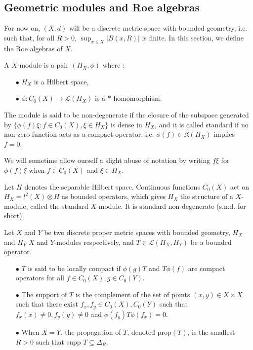 
\subsection{Geometric modules and Roe algebras}

For now on, $(X,d)$ will be a discrete metric space with bounded geometry, i.e. such that, for all $R>0$, $\sup_{x\in X} |B(x,R)|$ is finite. In this section, we define the Roe algebras of $X$. 

\begin{definition} A $X$-module is a pair $(H_X,\phi)$ where :
\begin{itemize}
\item[$\bullet$] $H_X$ is a Hilbert space,
\item[$\bullet$] $\phi : C_0(X)\rightarrow \mathcal L(H_X)$ is a $*$-homomorphism. 
\end{itemize}
The module is said to be non-degenerate if the closure of the subspace generated by $\{\phi(f)\xi : f\in C_0(X), \xi\in H_X\}$ is dense in $H_X$, and it is called standard if no non-zero function acts as a compact operator, i.e. $\phi(f) \in\mathfrak K(H_X)$ implies $f=0$.
\end{definition}

We will sometime allow ourself a slight abuse of notation by writing $f\xi$ for $\phi(f)\xi$ when $f\in C_0(X)$ and $\xi \in H_X$.

\begin{Expl}
Let $H$ denotes the separable Hilbert space. Continuous functions $C_0(X)$ act on $H_X =l^2(X)\otimes H$ as bounded operators, which gives $H_X$ the structure of a $X$-module, called the standard $X$-module. It is standard non-degenerate (s.n.d. for short).  
\end{Expl}

\begin{definition}
Let $X$ and $Y$ be two discrete proper metric spaces with bounded geometry, $H_X$ and $H_Y$ $X$ and $Y$-modules respectively, and $T\in \mathcal L(H_X, H_Y)$ be a bounded operator.
\begin{itemize}
\item[$\bullet$] $T$ is said to be locally compact if $\phi(g)T$ and $T\phi(f)$ are compact operators for all $f\in C_0(X),g\in C_0(Y)$.
\item[$\bullet$] The support of $T$ is the complement of the set of points $(x,y)\in X\times X$ such that there exist $f_x,f_y\in C_0(X),C_0(Y)$ such that $f_x(x)\neq 0,f_{y}(y)\neq 0$ and $\phi(f_{y}) T \phi(f_x)=0$.
\item[$\bullet$] When $X=Y$, the propagation of $T$, denoted prop$(T)$, is the smallest $R>0$ such that supp $T \subseteq \Delta_R$.
\end{itemize}
\end{definition}

